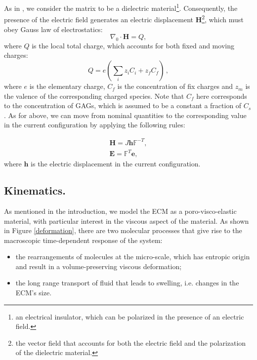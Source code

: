 \documentclass[runningheads]{llncs}
\newcommand{\F}{\ensuremath{\mathbb{F}}}
\begin{document}
As in \cite{Reviewpolyel}, we consider the matrix to be a dielectric material\footnote{an electrical insulator, which can be polarized in the presence of an electric field.}. Consequently, the presence of the electric field generates an electric displacement $\mathbf{H}$\footnote{the vector field that accounts for both the electric field and the polarization of the dielectric material.}, which must obey Gauss law of electrostatics:
\begin{equation}
\nabla_0 \cdot \mathbf{H}= Q,
\label{gauss}
\end{equation}
where $Q$ is the local total charge, which accounts for both fixed and moving charges:
\begin{equation}
Q = e\left(\sum\limits_{i} z_i C_i+z_f C_{f}\right)\, , 
\end{equation}
where $e$ is the elementary charge, $C_f$ is the concentration of fix charges and $z_m$ is the valence of the corresponding charged species. Note that $C_f$ here corresponds to the concentration of GAGs, which is assumed to be a constant a fraction of $C_s$. As for above, we can move from nominal quantities to the corresponding value in the current configuration by applying the following rules:

\begin{eqnarray}
\mathbf{H} = J \mathbf{h}\F^{-T},\\
\mathbf{E} = \F^T \mathbf{e},
\end{eqnarray}
where $\mathbf{h}$ is the electric displacement in the current configuration.

\subsection{Kinematics.}
\label{kin}

As mentioned in the introduction, we model the ECM as a poro-visco-elastic material, with particular interest in the viscous aspect of the material. As shown in Figure \ref{deformation}, there are two molecular processes that give rise to the macroscopic time-dependent response of the system: 
\begin{itemize}
	\item [1.] the rearrangements of molecules at the micro-scale,  which has entropic origin and result in a volume-preserving viscous deformation;
	\item[2.] the long range transport of fluid that leads to swelling, i.e. changes in the ECM's size. 
\end{itemize}
\end{document}
